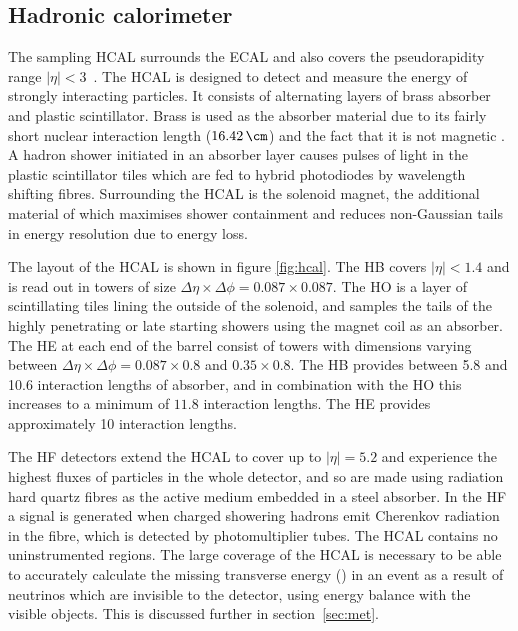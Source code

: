 \subsection{Hadronic calorimeter}
\label{sec:hcal}

The sampling \ac{HCAL} surrounds the \ac{ECAL} and also
covers the pseudorapidity range $|\eta|<3$~\cite{Chatrchyan:2008aa}. The
\ac{HCAL} is designed to detect and measure the energy of strongly interacting
particles. It consists of alternating layers of brass absorber and plastic
scintillator. Brass is used as the absorber material due to its fairly short
nuclear interaction length ($16.42\,\cm$) and the fact that it is not magnetic
\cite{PDG}. A hadron shower initiated in an absorber layer causes pulses of 
light in the plastic scintillator tiles which are fed to hybrid photodiodes 
by wavelength shifting fibres. Surrounding the \ac{HCAL} is the solenoid magnet,
the additional material of which maximises shower containment and reduces 
non-Gaussian tails in energy resolution due to energy loss. 

The layout of the \ac{HCAL} is shown in figure \ref{fig:hcal}. The \ac{HB}
covers $|\eta|<1.4$ and is read out in towers of size
$\Delta\eta \times \Delta\phi = 0.087\times0.087$. The \ac{HO}
is a layer of scintillating tiles lining the outside of the solenoid, and
samples the tails of the highly penetrating or late starting showers using the magnet coil as an
absorber. The \ac{HE} at each end of the barrel
consist of towers with dimensions varying between $\Delta\eta \times \Delta\phi
= 0.087\times0.8$ and $0.35\times0.8$. The \ac{HB} provides between 5.8 and 10.6
interaction lengths of absorber, and in combination with the \ac{HO} this increases
to a minimum of $11.8$ interaction lengths. The \ac{HE} provides approximately
10 interaction lengths. 

The \ac{HF} detectors extend the \ac{HCAL} to cover up
to $|\eta|=5.2$ and experience the highest fluxes of particles in the whole
detector, and so are made using radiation hard quartz fibres as the active medium
embedded in a steel absorber. In the \ac{HF} a signal is generated when charged
showering hadrons emit Cherenkov radiation in the fibre, which is detected by
photomultiplier tubes. The \ac{HCAL} contains no
uninstrumented regions. The large coverage of the
\ac{HCAL} is necessary to be able to accurately calculate the missing transverse energy
(\MET) in an event as a result of neutrinos which are invisible to the detector,
using energy balance with the visible objects. This is discussed further in
section~\ref{sec:met}.


